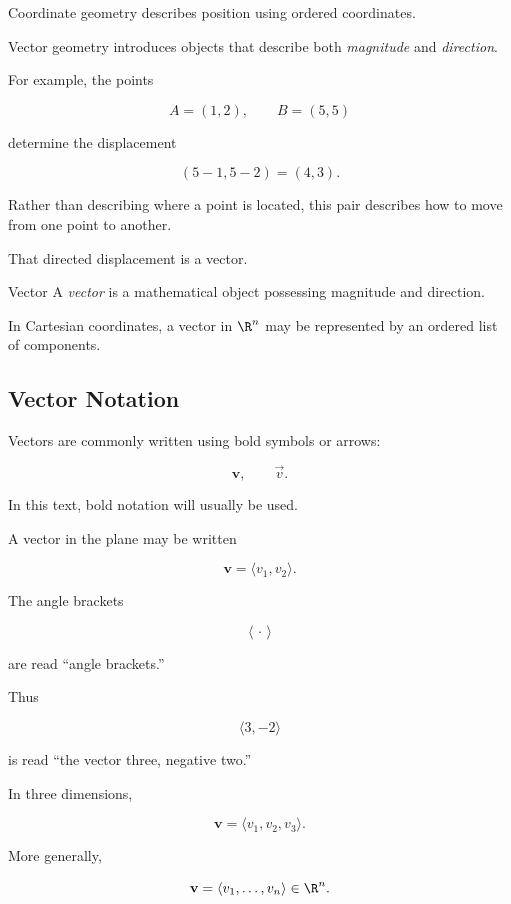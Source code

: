 Coordinate geometry describes position using ordered coordinates.

Vector geometry introduces objects that describe both \emph{magnitude} and
\emph{direction}.

For example, the points

\[ A=(1,2),\qquad B=(5,5) \]

determine the displacement

\[ (5-1,5-2)=(4,3). \]

Rather than describing where a point is located, this pair describes how to
move from one point to another.

That directed displacement is a vector.

\begin{definitionbox}{Vector}
A \emph{vector} is a mathematical object possessing magnitude and direction.

In Cartesian coordinates, a vector in \(\R^n\) may be represented by an
ordered list of components.
\end{definitionbox}

\subsection{Vector Notation}
\label{subsec:vector-notation}

Vectors are commonly written using bold symbols or arrows:

\[ \mathbf{v},\qquad \vec{v}. \]

In this text, bold notation will usually be used.

A vector in the plane may be written

\[ \mathbf{v}=\langle v_1,v_2\rangle. \]

The angle brackets

\[ \langle\,\cdot\,\rangle \]

are read ``angle brackets.''

Thus

\[ \langle 3,-2\rangle \]

is read ``the vector three, negative two.''

In three dimensions,

\[ \mathbf{v}=\langle v_1,v_2,v_3\rangle. \]

More generally,

\[ \mathbf{v}=\langle v_1,\ldots,v_n\rangle\in\R^n. \]

